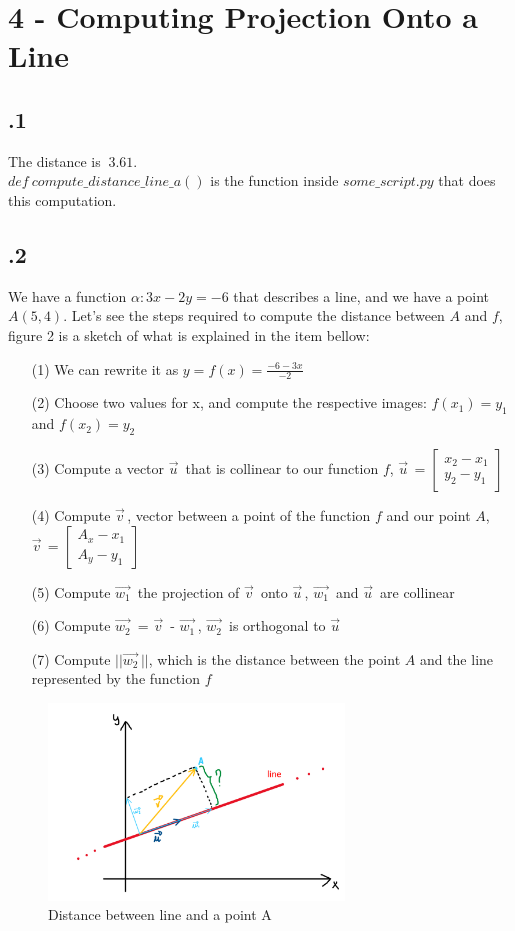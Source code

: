 \documentclass[a4paper]{article}
\begin{document}
\section*{4 - Computing Projection Onto a Line}
\subsection*{.1}
The distance is $~3.61$.\\
\textbf{$def\ compute\_distance\_line\_a()$} is the function inside $some\_script.py$ that does this computation.
\subsection*{.2}
We have a function $\alpha : 3x - 2y = -6$ that describes a line, and we have a point $A(5, 4)$. Let's see the steps required to compute the distance between $A$ and $f$, figure 2 is a sketch of what is explained in the item bellow:
\begin{itemize}
\item[(1)] We can rewrite it as $y = f(x) = \frac{-6 -3x}{-2}$
\item[(2)] Choose two values for x, and compute the respective images: $f(x_{1}) = y_{1}$ and $f(x_{2}) = y_{2}$
\item[(3)] Compute a vector $\vec{u}^{\,}$ that is collinear to our function $f$, $\vec{u}^{\,} = \begin{bmatrix} x_{2} - x_{1}\\y_{2} - y_{1} \end{bmatrix}$
\item[(4)] Compute $\vec{v}^{\,}$, vector between a point of the function $f$ and our point $A$, $\vec{v}^{\,} = \begin{bmatrix}  A_{x} - x_{1}\\ A_{y} - y_{1} \end{bmatrix}$
\item[(5)] Compute $\vec{w_{1}}^{\,}$ the projection of $\vec{v}^{\,}$ onto $\vec{u}^{\,}$, $\vec{w_{1}}^{\,}$ and $\vec{u}^{\,}$ are collinear
\item[(6)] Compute $\vec{w_{2}}^{\,}$ = $\vec{v}^{\,}$ - $\vec{w_{1}}^{\,}$, $\vec{w_{2}}^{\,}$ is orthogonal to $\vec{u}^{\,}$
\item[(7)] Compute $||\vec{w_{2}}^{\,}||$, which is the distance between the point $A$ and the line represented by the function $f$
\end{itemize}

\begin{figure}[H]
\center
\includegraphics[width=0.7\textwidth]{images/projection_exo_4.PNG}
\caption{Distance between line and a point A}
\end{figure}
\end{document}
